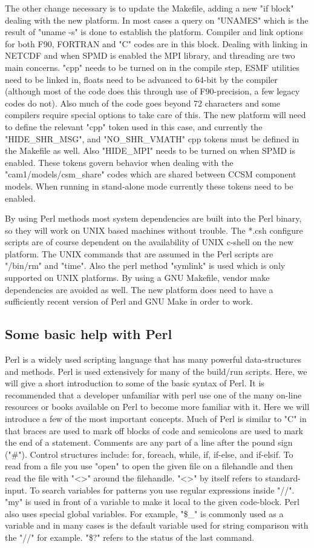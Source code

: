 \documentclass[]{article}
\begin{document}
The other change necessary is to update the Makefile, adding a new "if block" dealing with
the new platform. In most cases a query on "UNAMES" which is the result of "uname -s" is
done to establish the platform. Compiler and link options for both F90, FORTRAN and "C"
codes are in this block. Dealing with linking in NETCDF and when SPMD is enabled the MPI 
library, and threading are two main concerns. "cpp" needs to be turned on in the compile step, 
ESMF utilities need to be linked in, floats need to be advanced to 64-bit by the compiler 
(although most of the code does this through use of F90-precision, a few legacy codes do not).
Also much of the code goes beyond 72 characters and some compilers require special options to
take care of this. The new platform will need to define the relevant "cpp" token used in
this case, and currently the "HIDE\_SHR\_MSG", and "NO\_SHR\_VMATH" cpp tokens must be defined
in the Makefile as well. Also "HIDE\_MPI" needs to be turned on when SPMD is enabled. These
tokens govern behavior when dealing with the "cam1/models/csm\_share" codes which are shared
between CCSM component models. When running in stand-alone mode currently these tokens need
to be enabled.

By using Perl methods most system dependencies are built into
the Perl binary, so they will work on UNIX based machines without trouble. The *.csh configure
scripts are of course dependent on the availability of UNIX c-shell on the new platform. The UNIX
commands that are assumed in the Perl scripts are "/bin/rm" and "time". Also the perl method 
"symlink" is used which is only supported on UNIX platforms. By using a GNU Makefile, vendor
make dependencies are avoided as well. The new platform does need to have a sufficiently recent
version of Perl and GNU Make in order to work.

\subsection{Some basic help with Perl}

Perl is a widely used scripting language that has many powerful data-structures and methods.
Perl is used extensively for many of the build/run scripts. Here, we will give a short introduction
to some of the basic syntax of Perl. It is recommended that a developer unfamiliar with perl
use one of the many on-line resources or books available on Perl to become more familiar
with it. Here we will introduce a few of the most important concepts. Much of Perl is similar
to "C" in that braces are used to mark off blocks of code and semicolons are used to mark
the end of a statement. Comments are any part of a line after the pound sign ("\#"). Control
structures include: for, foreach, while, if, if-else, and if-elsif. To read from a file you
use "open" to open the given file on a filehandle and then read the file with "<>" around
the filehandle. "<>" by itself refers to standard-input. To search variables for patterns 
you use regular expressions inside "//". "my" is used in front of a variable to make it 
local to the given code-block. Perl also uses special global variables. For example, "\$\_"
is commonly used as a variable and in many cases is the default variable used for string
comparison with the "//" for example. "\$?" refers to the status of the last command.
\end{document}
